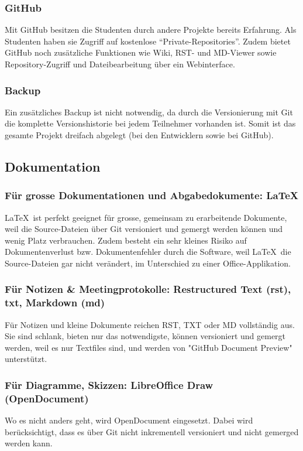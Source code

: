 \subsubsection{GitHub}
Mit GitHub besitzen die Studenten durch andere Projekte bereits Erfahrung. Als
Studenten haben sie Zugriff auf kostenlose ``Private-Repositories''. Zudem
bietet GitHub noch zusätzliche Funktionen wie Wiki, RST- und MD-Viewer sowie
Repository-Zugriff und Dateibearbeitung über ein Webinterface.

\subsubsection{Backup}
Ein zusätzliches Backup ist nicht notwendig, da durch die Versionierung mit Git die komplette Versionshistorie bei jedem Teilnehmer vorhanden ist. Somit ist das gesamte Projekt dreifach abgelegt (bei den Entwicklern sowie bei GitHub).


\subsection{Dokumentation}
\subsubsection{Für grosse Dokumentationen und Abgabedokumente: \LaTeX}
\LaTeX\ ist perfekt geeignet für grosse, gemeinsam zu erarbeitende Dokumente,
weil die Source-Dateien über Git versioniert und gemergt werden können und wenig
Platz verbrauchen. Zudem besteht ein sehr kleines Risiko auf Dokumentenverlust
bzw. Dokumentenfehler durch die Software, weil \LaTeX\ die Source-Dateien gar
nicht verändert, im Unterschied zu einer Office-Applikation.

\subsubsection{Für Notizen \& Meetingprotokolle: Restructured Text (rst), txt, Markdown (md)}
Für Notizen und kleine Dokumente reichen RST, TXT oder MD vollständig aus. Sie
sind schlank, bieten nur das notwendigste, können versioniert und gemergt
werden, weil es nur Textfiles sind, und werden von "GitHub Document Preview" unterstützt.

\subsubsection{Für Diagramme, Skizzen: LibreOffice Draw (OpenDocument)}
Wo es nicht anders geht, wird OpenDocument eingesetzt. Dabei wird
berücksichtigt, dass es über Git nicht inkrementell versioniert und nicht
gemerged werden kann.



